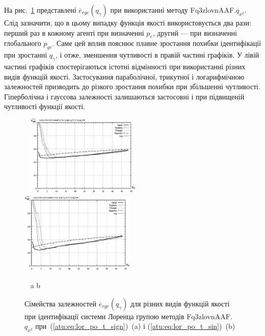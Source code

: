 На рис.~\ref{atu:f:lor_ftype_rge} представлені
$ \overline{e}_{rge} (q_\gamma) $ при використанні методу
Fq3zlovnAAF.$q_{x^2}$.
Слід зазначити, що в цьому випадку функція якості
використовується два рази: перший раз в кожному агенті при
визначенні
$ p_e $, другий --- при визначенні глобального
$ p_{ge} $. Саме цей вплив пояснює плавне зростання похибки
ідентифікації при зростанні
$ q_\gamma $, і отже, зменшення чутливості в правій частині графіків. У
лівій частині графіків спостерігаються істотні відмінності
при використанні різних видів функцій якості. Застосування
параболічної, трикутної і логарифмічною залежностей
призводить до різкого зростання похибки при збільшенні
чутливості. Гіперболічна і гауссова залежності залишаються
застосовні і при підвищеній чутливості функції якості.

\begin{figure}[ht!]
  \begin{center}
    ~ \hfill
    \includegraphics[width=0.49\textwidth]{p/cha/lor/Fq3zlovnAAF/f_type/lor_Fq3zlovnAAF_qx2_Ft-p_qg_e_all_sign_rge.png}
    \hfill
    \includegraphics[width=0.49\textwidth]{p/cha/lor/Fq3zlovnAAF/f_type/lor_Fq3zlovnAAF_qx2_Ft-p_qg_e_all_sin_rge.png}
    \hfill ~
  \end{center}
  \vspace{-1.0ex}
  \begin{center}
    ~ \hfill a \hfill\hfill b \hfill ~
  \end{center}
  \vspace{-1.5ex}
  \caption{Сімейства залежностей $ \overline{e}_{rge} (q_\gamma) $ для різних видів функцій якості при ідентифікації системи Лоренца групою методів Fq3zlovnAAF.$q_{x^2} $ при~(\ref{atu:eq:lor_po_t_sign})~(a) і (\ref{atu:eq:lor_po_t_sin})~(b)}
\label{atu:f:lor_ftype_rge}
\end{figure}


